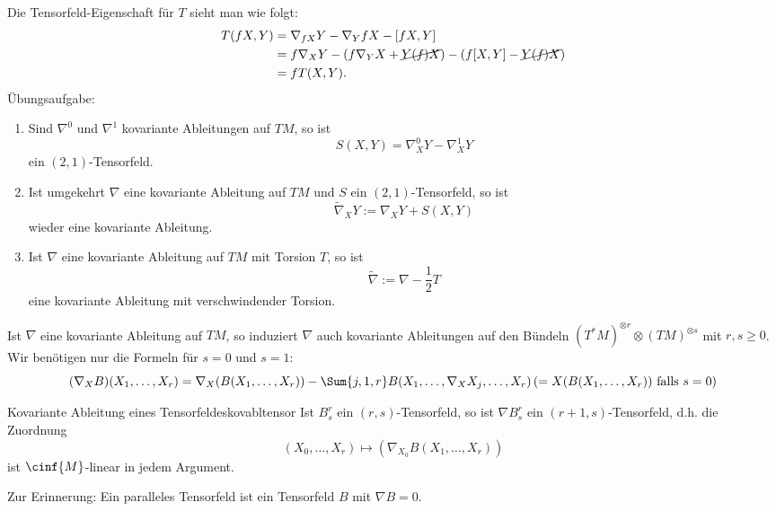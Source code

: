 Die Tensorfeld-Eigenschaft für $T$ sieht man wie folgt:
\begin{align}
T(fX, Y) &= \nabla_{fX} Y - \nabla_Y fX - [fX, Y]\\
&= f \nabla_X Y - (f \nabla_Y X + \cancel{Y(f) X}) - (f [X, Y] - \cancel{Y(f)X})\\
&= f T(X,Y).
\end{align}
Übungsaufgabe:
\begin{enumerate}
\item Sind $\nabla^0$ und $\nabla^1$ kovariante Ableitungen auf $TM$, so ist 
\begin{equation}
S(X,Y) = \nabla^0_X Y - \nabla^1_X Y
\end{equation}
ein $(2,1)$-Tensorfeld.
\item Ist umgekehrt $\nabla$ eine kovariante Ableitung auf $TM$ und $S$ ein $(2,1)$-Tensorfeld, so ist
\begin{equation}
\tilde{\nabla}_X Y := \nabla_X Y + S(X,Y)
\end{equation}
wieder eine kovariante Ableitung.
\item Ist $\nabla$ eine kovariante Ableitung auf $TM$ mit Torsion $T$, so ist
\begin{equation}
\tilde{\nabla} := \nabla - \frac{1}{2} T
\end{equation}
eine kovariante Ableitung mit verschwindender Torsion.
\end{enumerate}
\begin{bemerkung}
Ist $\nabla$ eine kovariante Ableitung auf $TM$, so induziert $\nabla$ auch kovariante Ableitungen auf den Bündeln $(T^\ast M)^{\otimes r} \otimes (TM)^{\otimes s}$ mit $r, s \geq 0$. Wir benötigen nur die Formeln für $s=0$ und $s=1$:
\begin{equation}
(\nabla_X B)(X_1, \dots, X_r) = \nabla_X (B(X_1, \dots, X_r)) - \Sum{j,1,r} B(X_1, \dots, \nabla_X X_j, \dots, X_r) \left( = X(B(X_1, \dots, X_r)) \ \text{falls} \ s=0\right)
\end{equation}
\end{bemerkung}
\begin{satz}{Kovariante Ableitung eines Tensorfeldes}{kovabltensor}
Ist $B^r_s$ ein $(r,s)$-Tensorfeld, so ist $\nabla B^r_s$ ein $(r+1, s)$-Tensorfeld, d.h. die Zuordnung
\begin{equation}
(X_0, \dots, X_r) \mapsto (\nabla_{X_0} B(X_1, \dots, X_r))
\end{equation}
ist $\cinf{M}$-linear in jedem Argument.
\end{satz}
Zur Erinnerung: Ein paralleles Tensorfeld ist ein Tensorfeld $B$ mit $\nabla B = 0$.\\
